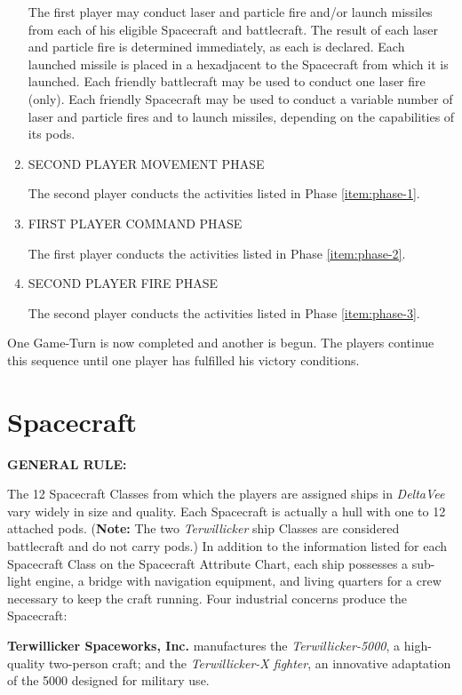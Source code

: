 \begin{enumerate}
  The first player may conduct laser and particle fire and/or launch
  missiles from each of his eligible Spacecraft and battlecraft. The
  result of each laser and particle fire is determined immediately, as
  each is declared. Each launched missile is placed in a hexadjacent
  to the Spacecraft from which it is launched. Each friendly
  battlecraft may be used to conduct one laser fire (only). Each
  friendly Spacecraft may be used to conduct a variable number of
  laser and particle fires and to launch missiles, depending on the
  capabilities of its pods.

\item SECOND PLAYER MOVEMENT PHASE 

  The second player conducts the activities listed in Phase
  \ref{item:phase-1}.

\item FIRST PLAYER COMMAND PHASE 

The first player conducts the activities listed in Phase \ref{item:phase-2}.

\item SECOND PLAYER FIRE PHASE 

The second player conducts the activities listed in Phase \ref{item:phase-3}. 
\end{enumerate}

One Game-Turn is now completed and another is begun. The players
continue this sequence until one player has fulfilled his victory
conditions.

\section{Spacecraft}
\label{sec:spacecraft}

\noindent\textbf{GENERAL RULE:}

The 12 Spacecraft Classes from which the players are assigned ships in
\emph{DeltaVee} vary widely in size and quality. Each Spacecraft is
actually a hull with one to 12 attached pods. (\textbf{Note:} The two
\emph{Terwillicker} ship Classes are considered battlecraft and do not
carry pods.) In addition to the information listed for each Spacecraft
Class on the Spacecraft Attribute Chart, each ship possesses a
sub-light engine, a bridge with navigation equipment, and living
quarters for a crew necessary to keep the craft running. Four
industrial concerns produce the Spacecraft:

\textbf{Terwillicker Spaceworks, Inc.} manufactures the
\emph{Terwillicker-5000}, a high-quality two-person craft; and the
\emph{Terwillicker-X fighter}, an innovative adaptation of the 5000
designed for military use.

